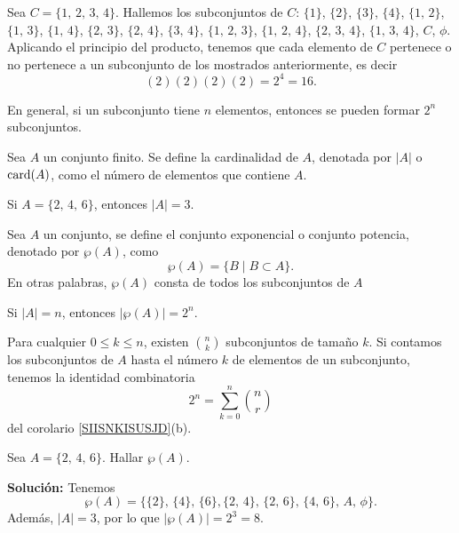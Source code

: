\newpage

\begin{myexample}
    Sea $C = \{1, \, 2, \, 3, \, 4 \}$. Hallemos los subconjuntos de $C$: $\{ 1 \}$, $\{ 2 \}$, $\{ 3 \}$, $\{ 4 \}$, $\{ 1, \, 2 \}$, $\{ 1, \, 3 \}$, $\{ 1, \, 4 \}$, $\{ 2, \, 3 \}$, $\{ 2, \, 4 \}$, $\{ 3, \, 4 \}$, $\{1, \, 2, \, 3 \}$, $\{ 1, \, 2, \, 4 \}$, $\{ 2, \, 3, \, 4 \}$, $\{ 1, \, 3, \, 4 \}$, $C$, $\phi$. Aplicando el principio del producto, tenemos que cada elemento de $C$ pertenece o no pertenece a un subconjunto de los mostrados anteriormente, es decir
    $$(2)(2)(2)(2) = 2^4 = 16.$$
\end{myexample}

\begin{BOX}
    En general, si un subconjunto tiene $n$ elementos, entonces se pueden formar $2^n$ subconjuntos.
\end{BOX}

\begin{definicion}{}{}
    Sea $A$ un conjunto finito. Se define la cardinalidad de $A$, denotada por $|A|$ o $\operatorname{card} (A)$, como el número de elementos que contiene $A$.
\end{definicion}

\begin{myexample}
    Si $A = \{ 2, \, 4, \, 6 \}$, entonces $|A| = 3$.
\end{myexample}

\begin{definicion}{}{}
    Sea $A$ un conjunto, se define el conjunto exponencial o conjunto potencia, denotado por $\wp (A)$, como
    $$\wp(A) = \{B \mid B \subset A\}.$$
    En otras palabras, $\wp (A)$ consta de todos los subconjuntos de $A$
\end{definicion}

\begin{myexample}
    Si $|A| = n$, entonces $|\wp (A)| = 2^n$.
\end{myexample}

\begin{BOX}
    Para cualquier $0 \leq k \leq n$, existen $\displaystyle \binom{n}{k}$ subconjuntos de tamaño $k$. Si contamos los subconjuntos de $A$ hasta el número $k$ de elementos de un subconjunto, tenemos la identidad combinatoria
    $$2^n = \sum_{k=0}^{n} \binom{n}{r}$$
    del corolario \ref{SIISNKISUSJD}(b).
\end{BOX}

\begin{myexample}
    Sea $A = \{ 2, \, 4, \, 6 \}$. Hallar $\wp(A)$.

    \tcblower
    \textbf{\color{jblueleft}Solución:} Tenemos
    $$\wp(A) = \big\{ \{ 2 \}, \, \{ 4 \}, \, \{ 6 \}, \{2, \, 4 \}, \, \{ 2, \, 6 \}, \, \{ 4, \, 6 \}, \, A, \, \phi \big\}.$$
    Además, $|A| = 3$, por lo que $|\wp(A)| = 2^3 = 8$.
\end{myexample}

